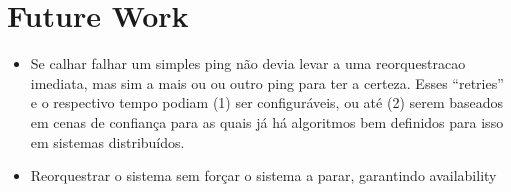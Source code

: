 \section{Future Work}
\begin{itemize}
    \item Se calhar falhar um simples ping não devia levar a uma reorquestracao imediata, mas sim a mais ou ou outro ping para ter a certeza. Esses “retries” e o respectivo tempo podiam (1) ser configuráveis, ou até (2) serem baseados em cenas de confiança para as quais já há algoritmos bem definidos para isso em sistemas distribuídos.
    \item Reorquestrar o sistema sem forçar o sistema a parar, garantindo availability
\end{itemize}